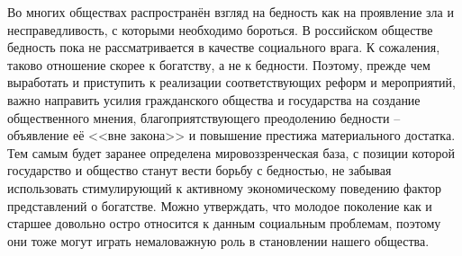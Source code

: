 Во многих обществах распространён взгляд на бедность как на проявление зла и 
несправедливость, с которыми необходимо бороться. В российском обществе 
бедность пока не рассматривается в качестве социального врага. К сожаления, 
таково отношение скорее к богатству, а не к бедности. Поэтому, прежде чем 
выработать и приступить к реализации соответствующих реформ и мероприятий, 
важно направить усилия гражданского общества и государства на создание 
общественного мнения, благоприятствующего преодолению бедности -- объявление 
её <<вне закона>> и повышение престижа материального достатка. Тем самым будет 
заранее определена мировоззренческая база, с позиции которой государство и 
общество станут вести борьбу с бедностью, не забывая использовать 
стимулирующий к активному экономическому поведению фактор представлений о 
богатстве. Можно утверждать, что молодое поколение как и старшее довольно 
остро относится к данным социальным проблемам, поэтому они тоже могут играть 
немаловажную роль в становлении нашего общества.

\newpage